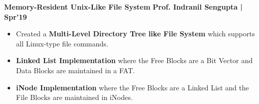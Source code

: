 \documentclass[10pt]{article}
\begin{document}
\fi
\large {\textbf{Memory-Resident Unix-Like File System}} \normalsize  \href{https://github.com/shmundhra/Systems-Programming/tree/master/File_System} {\hspace{0.5ex}\faGithub} {\hfill} \textbf{Prof. Indranil Sengupta | Spr'19}\\[-1.75em]
\begin{itemize}
    \item Created a \textbf{Multi-Level Directory Tree like File System} which supports all Linux-type file commands.\\[-1.9em]
    \item \textbf{Linked List Implementation} where the {Free Blocks are a Bit Vector} and {Data Blocks are maintained in a FAT}.\\[-1.9em]
    \item \textbf{iNode Implementation} where the {Free Blocks are a Linked List}  and the {File Blocks are maintained in iNodes}.\\[-1em]
\end{itemize}
\end{document}
